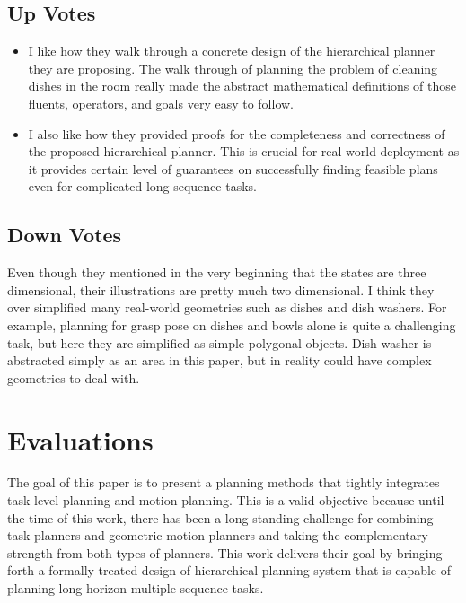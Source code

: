 \documentclass[10pt, twocolumn]{article}
\begin{document}
\subsection{Up Votes}
\begin{itemize}
  \item I like how they walk through a concrete design of the hierarchical planner
    they are proposing. The walk through of planning the problem of cleaning
    dishes in the room really made the abstract mathematical definitions of those
    fluents, operators, and goals very easy to follow.

  \item I also like how they provided proofs for the completeness and correctness
    of the proposed hierarchical planner. This is crucial for real-world deployment
    as it provides certain level of guarantees on successfully finding feasible
    plans even for complicated long-sequence tasks.
\end{itemize}

\subsection{Down Votes}
Even though they mentioned in the very beginning that the states are three dimensional,
their illustrations are pretty much two dimensional. I think they over simplified
many real-world geometries such as dishes and dish washers. For example, planning
for grasp pose on dishes and bowls alone is quite a challenging task, but here
they are simplified as simple polygonal objects. Dish washer is abstracted
simply as an area in this paper, but in reality could have complex geometries
to deal with.

\section{Evaluations}
The goal of this paper is to present a planning methods that tightly integrates
task level planning and motion planning. This is a valid objective because
until the time of this work, there has been a long standing challenge for
combining task planners and geometric motion planners and taking the complementary
strength from both types of planners. This work delivers their goal by bringing
forth a formally treated design of hierarchical planning system that
is capable of planning long horizon multiple-sequence tasks.
\end{document}
